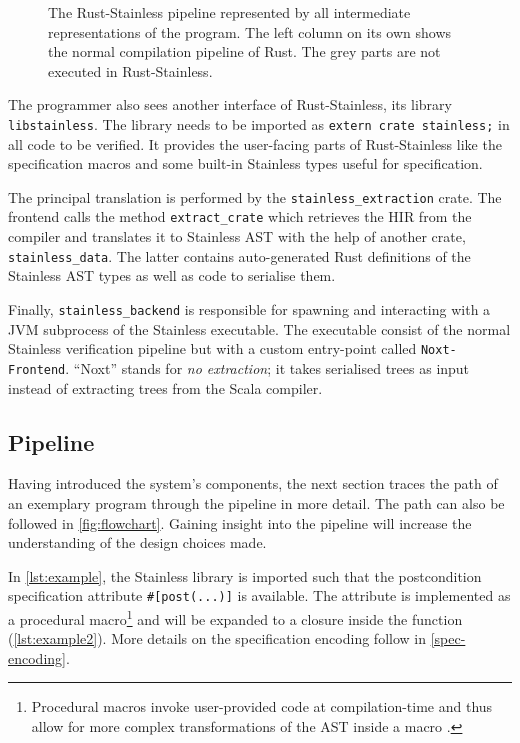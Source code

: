 \begin{figure}
  \begin{center}
  
  \caption{
    The Rust-Stainless pipeline represented by all intermediate representations
    of the program. The left column on its own shows the normal compilation
    pipeline of Rust. The grey parts are not executed in Rust-Stainless.
  }
  \label{fig:flowchart}
  \end{center}
\end{figure}

The programmer also sees another interface of Rust-Stainless, its library
\lstinline!libstainless!. The library needs to be imported as
\passthrough{\lstinline!extern crate stainless;!} in all code to be verified. It
provides the user-facing parts of Rust-Stainless like the specification macros
and some built-in Stainless types useful for specification.

The principal translation is performed by the \lstinline!stainless_extraction!
crate. The frontend calls the method \lstinline!extract_crate! which retrieves
the HIR from the compiler and translates it to Stainless AST with the help of
another crate, \lstinline!stainless_data!. The latter contains auto-generated
Rust definitions of the Stainless AST types as well as code to serialise them.

Finally, \lstinline!stainless_backend! is responsible for spawning and
interacting with a JVM subprocess of the Stainless executable. The executable
consist of the normal Stainless verification pipeline but with a custom
entry-point called \lstinline!Noxt-Frontend!. ``Noxt'' stands for \emph{no
extraction}; it takes serialised trees as input instead of extracting trees from
the Scala compiler.

\subsection{Pipeline}
\label{sec:pipeline}

Having introduced the system's components, the next section traces the path of
an exemplary program through the pipeline in more detail. The path can also be
followed in \autoref{fig:flowchart}. Gaining insight into the pipeline will
increase the understanding of the design choices made.

In \autoref{lst:example}, the Stainless library is imported such that the
postcondition specification attribute \lstinline!#[post(...)]! is available. The
attribute is implemented as a procedural macro\footnote{Procedural macros invoke
user-provided code at compilation-time and thus allow for more complex
transformations of the AST inside a macro \cite[section ``Procedural
Macros'']{rustref}.} and will be expanded to a closure inside the function
(\autoref{lst:example2}). More details on the specification encoding follow in
\autoref{spec-encoding}.

